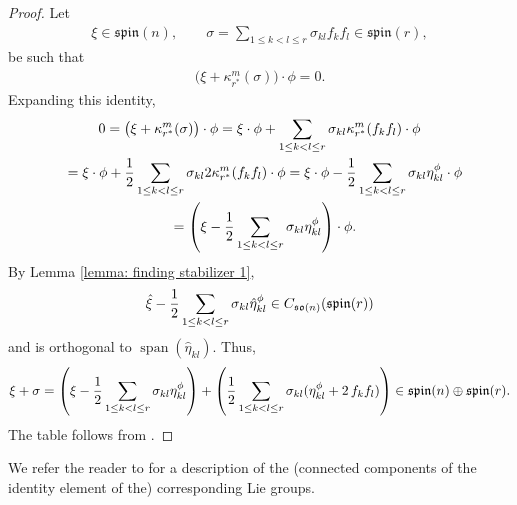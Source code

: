 \documentclass[pdftex]{sigma}
\numberwithin{equation}{section}
\begin{document}
\begin{proof} Let
\begin{gather*}
 \xi \in \mathfrak{spin}(n),\qquad
 \sigma = \sum_{1\leq k<l\leq r} \sigma_{kl}f_kf_l \in\mathfrak{spin}(r),
\end{gather*}
be such that
\begin{gather*}\big(\xi+\kappa_{r^*}^{m} (\sigma)\big)\cdot \phi =0.\end{gather*}
Expanding this identity,
\begin{gather*}
 0 = \big(\xi+\kappa_{r^*}^{m} (\sigma)\big)\cdot \phi =
 \xi\cdot\phi + \sum_{1\leq k<l\leq r} \sigma_{kl}\kappa_{r^*}^{m}(f_kf_l)\cdot\phi\\
 \hphantom{0}{} =
 \xi\cdot\phi + {1\over 2}\sum_{1\leq k<l\leq r} \sigma_{kl}2\kappa_{r^*}^{m}(f_kf_l)\cdot\phi =
 \xi\cdot\phi - {1\over 2}\sum_{1\leq k<l\leq r} \sigma_{kl}\eta_{kl}^\phi\cdot\phi\\
\hphantom{0}{} =
 \left(\xi - {1\over 2}\sum_{1\leq k<l\leq r} \sigma_{kl}\eta_{kl}^\phi\right)\cdot\phi.
\end{gather*}
By Lemma \ref{lemma: finding stabilizer 1},
\begin{gather*}\hat{\xi} - {1\over 2}\sum_{1\leq k<l\leq r} \sigma_{kl}\hat{\eta}_{kl}^\phi\in C_{\mathfrak{so}(n)}(\mathfrak{spin}(r))\end{gather*}
and is orthogonal to $\operatorname{span}(\hat{\eta}_{kl})$.
Thus,
\begin{gather*}\xi+\sigma = \left(\xi - {1\over 2}\sum_{1\leq k<l\leq r} \sigma_{kl}\eta_{kl}^\phi\right) + \left({1\over 2}\sum_{1\leq k<l\leq r} \sigma_{kl}(\eta_{kl}^\phi + 2\,f_kf_l)\right) \in \mathfrak{spin}(n)\oplus\mathfrak{spin}(r).\end{gather*}
The table follows from \cite[Theorems 3.1 and 3.2]{AH}.
\end{proof}

We refer the reader to \cite[Theorem 3.2]{AGH} for a description of the (connected components of the identity element of the) corresponding Lie groups.
\end{document}
